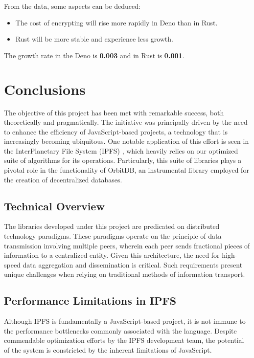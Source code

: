 \documentclass[10pt,journal,compsoc]{IEEEtran}
\begin{document}
From the data, some aspects can be deduced:
\begin{itemize}
    \item The cost of encrypting will rise more rapidly in Deno than in Rust.
    \item Rust will be more stable and experience less growth.
\end{itemize}

The growth rate in the Deno is \textbf{0.003} and in Rust is \textbf{0.001}.

\section{Conclusions}

The objective of this project has been met with remarkable success, both theoretically and pragmatically. The initiative was principally driven by the need to enhance the efficiency of JavaScript-based projects, a technology that is increasingly becoming ubiquitous. One notable application of this effort is seen in the InterPlanetary File System (IPFS) \cite{IPFS}, which heavily relies on our optimized suite of algorithms for its operations. Particularly, this suite of libraries plays a pivotal role in the functionality of OrbitDB, an instrumental library employed for the creation of decentralized databases.

\subsection{Technical Overview}

The libraries developed under this project are predicated on distributed technology paradigms. These paradigms operate on the principle of data transmission involving multiple peers, wherein each peer sends fractional pieces of information to a centralized entity. Given this architecture, the need for high-speed data aggregation and dissemination is critical. Such requirements present unique challenges when relying on traditional methods of information transport.

\subsection{Performance Limitations in IPFS}

Although IPFS is fundamentally a JavaScript-based project, it is not immune to the performance bottlenecks commonly associated with the language. Despite commendable optimization efforts by the IPFS development team, the potential of the system is constricted by the inherent limitations of JavaScript.
\end{document}
